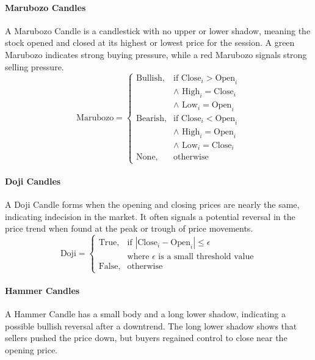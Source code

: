 \documentclass[conference]{IEEEtran}
\begin{document}
\paragraph{Marubozo Candles}
A Marubozo Candle is a candlestick with no upper or lower shadow, meaning the stock opened and closed at its highest or lowest price for the session. A green Marubozo indicates strong buying pressure, while a red Marubozo signals strong selling pressure.
\[
\text{Marubozo} = 
\begin{cases}
\text{Bullish}, & \text{if} \text{ Close}_{i} > \text{Open}_{i} \\
& \land \text{ High}_{i} = \text{Close}_{i} \\
& \land \text{ Low}_{i} = \text{Open}_{i} \\ 
\text{Bearish}, & \text{if} \text{ Close}_{i} < \text{Open}_{i} \\
& \land \text{ High}_{i} = \text{Open}_{i} \\
& \land \text{ Low}_{i} = \text{Close}_{i} \\
\text{None}, & \text{otherwise}
\end{cases}
\]

\paragraph{Doji Candles}
A Doji Candle forms when the opening and closing prices are nearly the same, indicating indecision in the market. It often signals a potential reversal in the price trend when found at the peak or trough of price movements.
\[
\text{Doji} = 
\begin{cases}
\text{True}, & \text{if } |\text{Close}_{i} - \text{Open}_{i}| \leq \epsilon \\
& \text{where } \epsilon \text{ is a small threshold value} \\
\text{False}, & \text{otherwise}
\end{cases}
\]

\paragraph{Hammer Candles}
A Hammer Candle has a small body and a long lower shadow, indicating a possible bullish reversal after a downtrend. The long lower shadow shows that sellers pushed the price down, but buyers regained control to close near the opening price.
\end{document}
